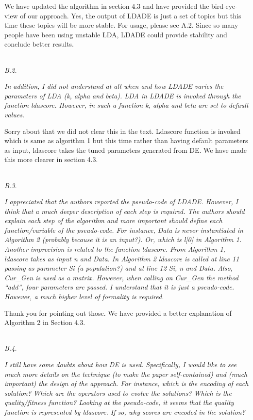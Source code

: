 \documentclass[conference]{IEEEtran}
\begin{document}
We have updated the algorithm in section 4.3 and have provided the bird-eye-view of our approach. Yes, the output of LDADE is just a set of topics but this time these topics will be more stable. For usage, please see A.2. Since so many people have been using unstable LDA, LDADE could provide stability and conclude better results.

\noindent
\textit{\\B.2.}  

\textit{In addition, I did not understand at all when and how LDADE varies the parameters of LDA (k, alpha and beta). LDA in LDADE is invoked through the function ldascore. However, in such a function k, alpha and beta are set to default values.\\}

Sorry about that we did not clear this in the text. Ldascore function is invoked which is same as algorithm 1 but this time rather than having default parameters as input, ldascore takes the tuned parameters generated from DE. We have made this more clearer in section 4.3.

\noindent
\textit{\\B.3.} 

\textit{I appreciated that the authors reported the pseudo-code of LDADE. However, I think that a much deeper description of each step is required. The authors should explain each step of the algorithm and more important should define each function/variable of the pseudo-code. For instance, Data is never instantiated in Algorithm 2 (probably because it is an input?). Or, which is l[0] in Algorithm 1. Another imprecision is related to the function ldascore. From Algorithm 1, ldascore takes as input n and Data. In Algorithm 2 ldascore is called at line 11 passing as parameter Si (a population?) and at line 12 Si, n and Data. Also, Cur\_Gen is used as a matrix. However, when calling on Cur\_Gen the method ``add'', four parameters are passed. I understand that it is just a pseudo-code. However, a much higher level of formality is required.\\}

Thank you for pointing out those. We have provided a better explanation of Algorithm 2 in Section 4.3. 

\noindent
\textit{\\B.4.} 

\textit{I still have some doubts about how DE is used. Specifically, I would like to see much more details on the technique (to make the paper self-contained) and (much important) the design of the approach. For instance, which is the encoding of each solution? Which are the operators used to evolve the solutions? Which is the quality/fitness function? Looking at the pseudo-code, it seems that the quality function is represented by ldascore. If so, why scores are encoded in the solution?\\} 
\end{document}
